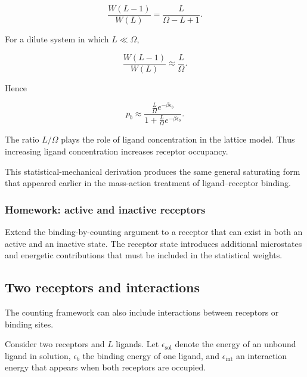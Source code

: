 \begin{equation}
    \frac{W(L-1)}{W(L)}=\frac{L}{\Omega-L+1}.
\end{equation}

For a dilute system in which $L\ll\Omega$,

\begin{equation}
    \frac{W(L-1)}{W(L)}\approx\frac{L}{\Omega}.
\end{equation}

Hence

\begin{equation}
    p_b\approx\frac{\frac{L}{\Omega}e^{-\beta\epsilon_b}}{1+\frac{L}{\Omega}e^{-\beta\epsilon_b}}.
\end{equation}

The ratio $L/\Omega$ plays the role of ligand concentration in the lattice model.
Thus increasing ligand concentration increases receptor occupancy.

This statistical-mechanical derivation produces the same general saturating form that appeared earlier in the mass-action treatment of ligand--receptor binding.


\subsubsection*{Homework: active and inactive receptors}

Extend the binding-by-counting argument to a receptor that can exist in both an active and an inactive state.
The receptor state introduces additional microstates and energetic contributions that must be included in the statistical weights.


\subsection{Two receptors and interactions}

The counting framework can also include interactions between receptors or binding sites.

Consider two receptors and $L$ ligands.
Let $\epsilon_{\mathrm{sol}}$ denote the energy of an unbound ligand in solution, $\epsilon_b$ the binding energy of one ligand, and $\epsilon_{\mathrm{int}}$ an interaction energy that appears when both receptors are occupied.

